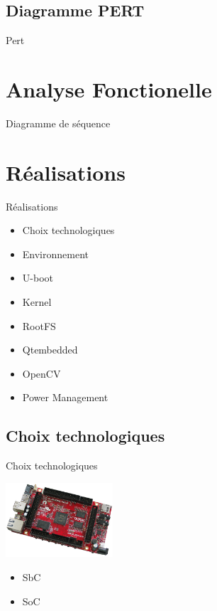 \documentclass[11pt]{beamer}
\begin{document}
	\subsection{Diagramme PERT}
	\begin{frame}{Pert}
		\begin{center}
			
		\end{center}
	\end{frame}
	
	\section{Analyse Fonctionelle}
	\begin{frame}{Diagramme de séquence}
	
	\end{frame}
	
	\section{Réalisations}
	
	\begin{frame}{Réalisations}
		\begin{center}
		\begin{itemize}
			\item Choix technologiques
			\item Environnement
			\item U-boot
			\item Kernel
			\item RootFS
			\item Qtembedded
			\item OpenCV
			\item Power Management
		\end{itemize}
		\end{center}
	\end{frame}
	
	\subsection{Choix technologiques}
	\begin{frame}{Choix technologiques}
	\begin{center}
		  \includegraphics[width=4cm]{commons/A20-OLinuXino-MICRO-0.jpg}
		 \begin{itemize}
			\item SbC
			\item SoC
		\end{itemize}
	\end{center}
	\end{frame}
	
\end{document}
